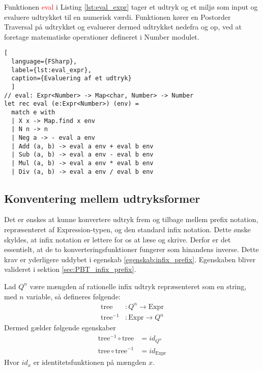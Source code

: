 Funktionen \textcolor{red}{eval} i Listing \ref{lst:eval_expr} tager et udtryk og et miljø som input og evaluere udtrykket til en numerisk værdi. Funktionen kører en Postorder Traversal på udtrykket og evaluerer dermed udtrykket nedefra og op, ved at foretage matematiske operationer defineret i Number modulet. 

\begin{lstlisting}[
  language={FSharp}, 
  label={lst:eval_expr}, 
  caption={Evaluering af et udtryk}
  ]
// eval: Expr<Number> -> Map<char, Number> -> Number
let rec eval (e:Expr<Number>) (env) =
  match e with
  | X x -> Map.find x env
  | N n -> n
  | Neg a -> - eval a env
  | Add (a, b) -> eval a env + eval b env
  | Sub (a, b) -> eval a env - eval b env
  | Mul (a, b) -> eval a env * eval b env
  | Div (a, b) -> eval a env / eval b env
\end{lstlisting}

\subsection{Konventering mellem udtryksformer}\label{sec:expression_generation}
Det er ønskes at kunne konvertere udtryk frem og tilbage mellem prefix notation, repræsenteret af Expression-typen, og den standard infix notation. Dette ønske skyldes, at infix notation er lettere for os at læse og skrive. Derfor er det essentielt, at de to konverteringsfunktioner fungerer som hinandens inverse. Dette krav er yderligere uddybet i egenskab \ref{egenskab:infix_prefix}. Egenskaben bliver valideret i sektion \ref{sec:PBT_infix_prefix}.

\vspace{0.5cm}
\begin{egenskab}\label{egenskab:infix_prefix}
    Lad $Q^n$ være mængden af rationelle infix udtryk repræsenteret som en string, med $n$ variable, så defineres følgende:
    \begin{align*}
      \text{tree}&: Q^n \to \text{Expr} \\
      \text{tree}^{-1}&: \text{Expr} \to  Q^n  
    \end{align*}
    Dermed gælder følgende egenskaber
    \begin{align*}
      \text{tree}^{-1} \circ \text{tree} &= id_{Q^n} \\
      \text{tree} \circ \text{tree}^{-1} &= id_{\text{Expr}}
    \end{align*}
    Hvor $id_{x}$ er identitetsfunktionen på mængden $x$.
\end{egenskab}

